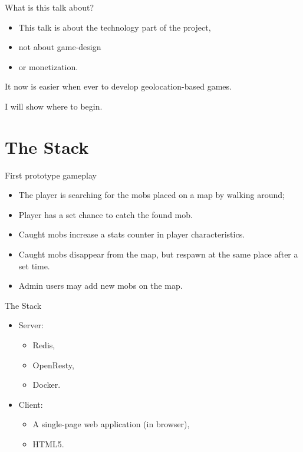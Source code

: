 \documentclass[aspectratio=169,handout,bigger]{beamer}
\begin{document}

\begin{frame}{What is this talk about?}
  \begin{itemize}
    \item This talk is about the technology part of the project,
    \item not about game-design
    \item or monetization.
  \end{itemize}
  \vspace*{1em}\par
  It now is easier when ever to develop geolocation-based games.
  \vspace*{1em}\par
  I will show where to begin.
\end{frame}


\section{The Stack}


\begin{frame}{First prototype gameplay}
  \begin{itemize}
    \item The player is searching for
          the mobs placed on a map by walking around;
    \item Player has a set chance to catch the found mob.
    \item Caught mobs increase a stats counter in player characteristics.
    \item Caught mobs disappear from the map,
          but respawn at the same place after a set time.
    \item Admin users may add new mobs on the map.
  \end{itemize}
\end{frame}


\begin{frame}{The Stack}
  \begin{itemize}
    \item Server:
    \begin{itemize}
      \item Redis,
      \item OpenResty,
      \item Docker.
    \end{itemize}
    \item Client:
    \begin{itemize}
      \item A single-page web application (in browser),
      \item HTML5.
    \end{itemize}
  \end{itemize}
\end{frame}
\end{document}
